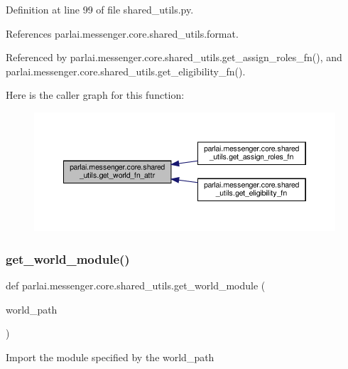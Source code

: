 Definition at line 99 of file shared\+\_\+utils.\+py.



References parlai.\+messenger.\+core.\+shared\+\_\+utils.\+format.



Referenced by parlai.\+messenger.\+core.\+shared\+\_\+utils.\+get\+\_\+assign\+\_\+roles\+\_\+fn(), and parlai.\+messenger.\+core.\+shared\+\_\+utils.\+get\+\_\+eligibility\+\_\+fn().

Here is the caller graph for this function\+:
\nopagebreak
\begin{figure}[H]
\begin{center}
\leavevmode
\includegraphics[width=350pt]{namespaceparlai_1_1messenger_1_1core_1_1shared__utils_a0a712961ea39c275ec4003871d0ff950_icgraph}
\end{center}
\end{figure}
\mbox{\label{namespaceparlai_1_1messenger_1_1core_1_1shared__utils_a248b150a0f94e645ab5c9cbeca09f92e}} 
\subsubsection{\texorpdfstring{get\+\_\+world\+\_\+module()}{get\_world\_module()}}
{\footnotesize\ttfamily def parlai.\+messenger.\+core.\+shared\+\_\+utils.\+get\+\_\+world\+\_\+module (\begin{DoxyParamCaption}\item[{}]{world\+\_\+path }\end{DoxyParamCaption})}

\begin{DoxyVerb}Import the module specified by the world_path\end{DoxyVerb}
 


